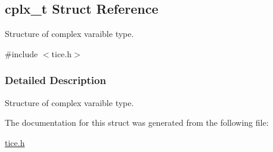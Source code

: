 \hypertarget{structcplx__t}{}\subsection{cplx\+\_\+t Struct Reference}
\label{structcplx__t}


Structure of complex varaible type.  




{\ttfamily \#include $<$tice.\+h$>$}



\subsubsection{Detailed Description}
Structure of complex varaible type. 

The documentation for this struct was generated from the following file\+:\begin{DoxyCompactItemize}
\item 
\hyperlink{tice_8h}{tice.\+h}\end{DoxyCompactItemize}
